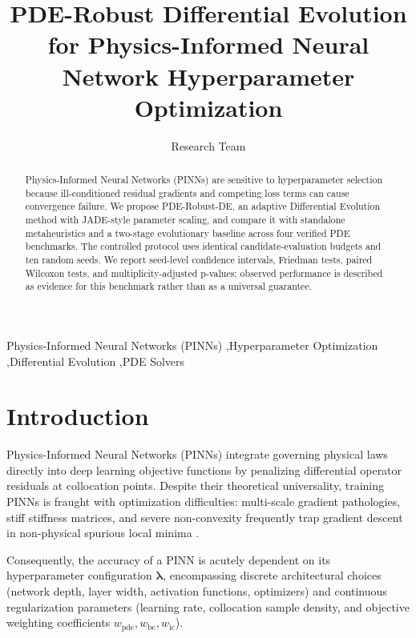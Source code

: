 \documentclass[authoryear,preprint,12pt]{elsarticle}
\begin{document}
\begin{frontmatter}

\title{PDE-Robust Differential Evolution for Physics-Informed Neural Network Hyperparameter Optimization}

\author[inst1]{Research Team}

\begin{abstract}
Physics-Informed Neural Networks (PINNs) are sensitive to hyperparameter selection because ill-conditioned residual gradients and competing loss terms can cause convergence failure. We propose PDE-Robust-DE, an adaptive Differential Evolution method with JADE-style parameter scaling, and compare it with standalone metaheuristics and a two-stage evolutionary baseline across four verified PDE benchmarks. The controlled protocol uses identical candidate-evaluation budgets and ten random seeds. We report seed-level confidence intervals, Friedman tests, paired Wilcoxon tests, and multiplicity-adjusted p-values; observed performance is described as evidence for this benchmark rather than as a universal guarantee.
\end{abstract}

\begin{keyword}
Physics-Informed Neural Networks (PINNs) \sep Hyperparameter Optimization \sep Differential Evolution \sep PDE Solvers
\end{keyword}

\end{frontmatter}

\section{Introduction}
\label{sec:intro}
Physics-Informed Neural Networks (PINNs) \citep{raissi2019physics, karniadakis2021physics} integrate governing physical laws directly into deep learning objective functions by penalizing differential operator residuals at collocation points. Despite their theoretical universality, training PINNs is fraught with optimization difficulties: multi-scale gradient pathologies, stiff stiffness matrices, and severe non-convexity frequently trap gradient descent in non-physical spurious local minima \citep{wang2021understanding, wang2022respecting}.

Consequently, the accuracy of a PINN is acutely dependent on its hyperparameter configuration $\boldsymbol{\lambda}$, encompassing discrete architectural choices (network depth, layer width, activation functions, optimizers) and continuous regularization parameters (learning rate, collocation sample density, and objective weighting coefficients $w_{\text{pde}}, w_{\text{bc}}, w_{\text{ic}}$). 
\end{document}
